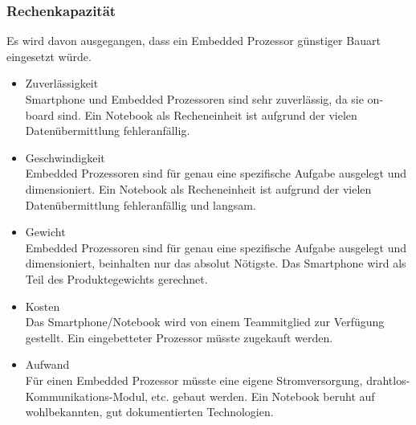 		\subsubsection{Rechenkapazität}
			Es wird davon ausgegangen, dass ein Embedded Prozessor günstiger Bauart eingesetzt würde.
			\begin{itemize}
				\item Zuverlässigkeit\\
				Smartphone und Embedded Prozessoren sind sehr zuverlässig, da sie on-board sind. Ein Notebook als Recheneinheit ist aufgrund der vielen Datenübermittlung fehleranfällig.
				\item Geschwindigkeit\\
				Embedded Prozessoren sind für genau eine spezifische Aufgabe ausgelegt und dimensioniert. Ein Notebook als Recheneinheit ist aufgrund der vielen Datenübermittlung fehleranfällig und langsam.
			 	\item Gewicht\\
			 	Embedded Prozessoren sind für genau eine spezifische Aufgabe ausgelegt und dimensioniert, beinhalten nur das absolut Nötigste. Das Smartphone wird als Teil des Produktegewichts gerechnet.
				\item Kosten\\
				Das Smartphone/Notebook wird von einem Teammitglied zur Verfügung gestellt. Ein eingebetteter Prozessor müsste zugekauft werden.
				\item Aufwand\\
				Für einen Embedded Prozessor müsste eine eigene Stromversorgung, drahtlos-Kommunikations-Modul, etc. gebaut werden. Ein Notebook beruht auf wohlbekannten, gut dokumentierten Technologien.
			\end{itemize}
			
